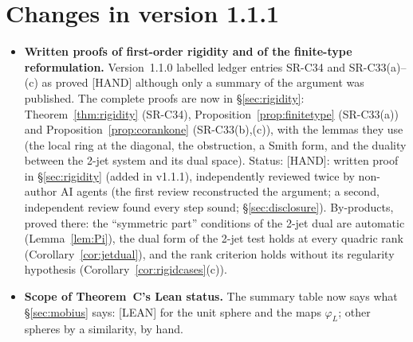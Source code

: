 \documentclass[11pt]{amsart}
\newcommand{\st}[1]{\textsf{[#1]}}
\theoremstyle{plain}
\theoremstyle{definition}
\begin{document}
\begin{abstract}
in Lean~4 on top of OpenAI's formalization and checked by Comparator on a fresh CI runner. We describe a second-order
necessary test, with computational evidence for its sufficiency, and state conjectures, including an
expected-dimension law for cyclic sets and measurable forms of Graham's conjecture. We observe that
Graham's conjecture holds trivially for colourings definable in an o-minimal structure (folklore
tameness), and, by a theorem of Dol'nikov and Karasev, for colourings that factor through boundedly
many polynomials. Several of the easier statements are
prior work by others (\S\ref{sec:credit}); version~1.1 corrects omissions in that credit
(see ``Changes in version~1.1'' below). A public ledger of the open problems, with replayable
starting states, accompanies the note.
\end{abstract}

\maketitle

\section*{Changes in version 1.1.1}

\begin{itemize}
\item \textbf{Written proofs of first-order rigidity and of the finite-type reformulation.} Version~1.1.0
labelled ledger entries SR-C34 and SR-C33(a)--(c) as proved \st{HAND} although only a summary of the
argument was published. The complete proofs are now in \S\ref{sec:rigidity}: Theorem~\ref{thm:rigidity}
(SR-C34), Proposition~\ref{prop:finitetype} (SR-C33(a)) and Proposition~\ref{prop:corankone}
(SR-C33(b),(c)), with the lemmas they use (the local ring at the diagonal, the obstruction, a Smith form,
and the duality between the 2-jet system and its dual space). Status: \st{HAND}: written proof in
\S\ref{sec:rigidity} (added in v1.1.1), independently reviewed twice by non-author AI agents (the first
review reconstructed the argument; a second, independent review found every step sound;
\S\ref{sec:disclosure}). By-products, proved there: the ``symmetric part'' conditions of
the 2-jet dual are automatic (Lemma~\ref{lem:Pi}), the dual form of the 2-jet test holds at every quadric
rank (Corollary~\ref{cor:jetdual}), and the rank criterion holds without its regularity hypothesis
(Corollary~\ref{cor:rigidcases}(c)).
\item \textbf{Scope of Theorem~C's Lean status.} The summary table now says what \S\ref{sec:mobius} says:
\st{LEAN} for the unit sphere and the maps $\varphi_L$; other spheres by a similarity, by hand.
\end{itemize}
\end{document}
